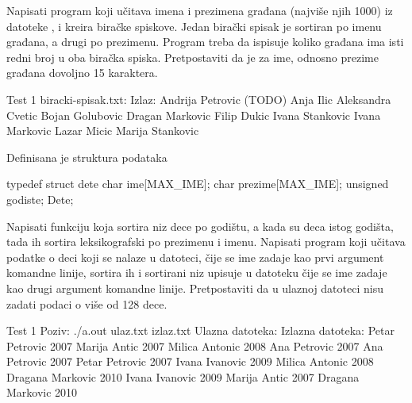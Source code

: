 \begin{Exercise}[label=509]
  Napisati program koji učitava imena i prezimena građana (najviše
  njih 1000) iz datoteke , i kreira biračke
  spiskove. Jedan birački spisak je sortiran po imenu građana, a drugi
  po prezimenu. Program treba da ispisuje koliko građana ima isti
  redni broj u oba biračka spiska. Pretpostaviti da je za ime, odnosno
  prezime građana dovoljno 15 karaktera.

\begin{miditest}
\begin{test}{Test 1}
biracki-spisak.txt:      Izlaz:
Andrija Petrovic         (TODO)
Anja Ilic
Aleksandra Cvetic
Bojan Golubovic
Dragan Markovic
Filip Dukic
Ivana Stankovic
Ivana Markovic
Lazar Micic
Marija Stankovic    
\end{test}
\end{miditest}
  
\end{Exercise}

\begin{Exercise}[label=510]
  Definisana je struktura podataka
\begin{ckod}
typedef struct dete
{
      char ime[MAX_IME];
      char prezime[MAX_IME];
      unsigned godiste;
} Dete;
\end{ckod}
Napisati funkciju koja sortira niz dece po godištu, a kada su deca
istog godišta, tada ih sortira leksikografski po prezimenu i
imenu. Napisati program koji učitava podatke o deci koji se nalaze u
datoteci, čije se ime zadaje kao prvi argument komandne linije,
sortira ih i sortirani niz upisuje u datoteku čije se ime zadaje kao
drugi argument komandne linije. Pretpostaviti da u ulaznoj datoteci
nisu zadati podaci o više od 128 dece.
  
\begin{maxitest}
\begin{test}{Test 1}
Poziv: ./a.out ulaz.txt izlaz.txt
Ulazna datoteka:                 Izlazna datoteka:
Petar Petrovic 2007              Marija Antic 2007
Milica Antonic 2008              Ana Petrovic 2007
Ana Petrovic 2007                Petar Petrovic 2007
Ivana Ivanovic 2009              Milica Antonic 2008
Dragana Markovic 2010            Ivana Ivanovic 2009
Marija Antic 2007                Dragana Markovic 2010
\end{test}
\end{maxitest}
  
\end{Exercise}

